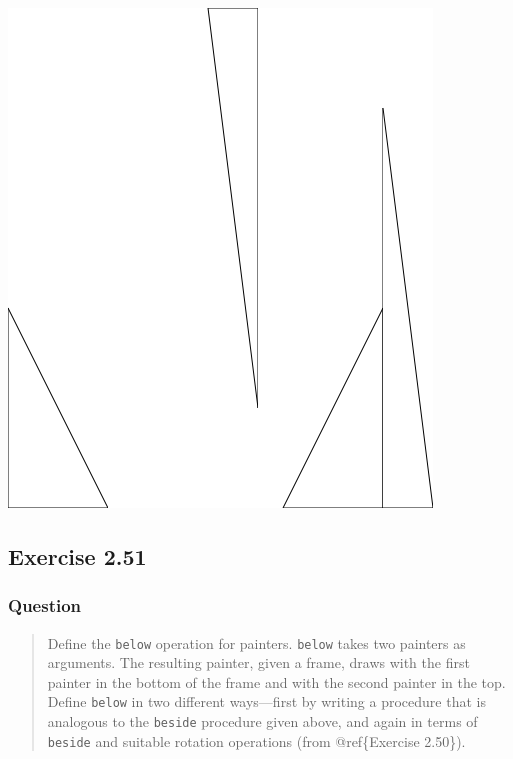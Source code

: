 \documentclass[final,fleqn,titlepage,twoside]{article}
\begin{document}
\begin{center}
\includegraphics[width=.9\linewidth]{2/pict/rotate2.png}
\end{center}

\subsection{Exercise 2.51}
\label{sec:org105b3b4}
\subsubsection{Question}
\label{sec:org8b1990f}
\begin{quote}
Define the \texttt{below} operation
for painters.  \texttt{below} takes two painters as arguments.  The resulting
painter, given a frame, draws with the first painter in the bottom of the frame
and with the second painter in the top.  Define \texttt{below} in two different
ways---first by writing a procedure that is analogous to the \texttt{beside}
procedure given above, and again in terms of \texttt{beside} and suitable
rotation operations (from @ref\{Exercise 2.50\}).
\end{quote}
\end{document}
